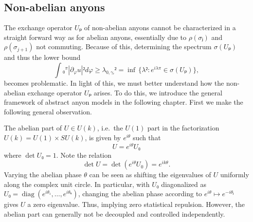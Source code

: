 \subsection{Non-abelian anyons}

The exchange operator $Uₚ$ of non-abelian anyons cannot be characterized in a straight forward way as for abelian anyons, essentially due to $ρ(σⱼ)$ and $ρ(σ_{j+1})$ not commuting. Because of this, determining the spectrum $σ(Uₚ)$ and thus the lower bound
\begin{equation}
    ∫₀^π |∂_φu|² dφ ≥ λ_{0,γᵣ}² = \inf \, \{ λ² : e^{iλπ} ∈ σ(Uₚ) \},
\end{equation}
becomes problematic. In light of this, we must better understand how the non-abelian exchange operator $Uₚ$ arises. To do this, we introduce the general framework of abstract anyon models in the following chapter. First we make the following general observation.

\begin{remark}
  The abelian part of $U ∈ U(k)$, i.e.\ the $U(1)$ part in the factorization $U(k) = U(1) × SU(k)$, is given by $e^{iθ}$ such that
  \begin{equation}
    U = e^{iθ} U₀
  \end{equation}
  where $\det U₀ = 1$. Note the relation
  \begin{equation}
    \det U = \det(e^{iθ}U_0) = e^{ikθ}.
  \end{equation}
  Varying the abelian phase $θ$ can be seen as shifting the eigenvalues of $U$ uniformly along the complex unit circle. In particular, with $U₀$ diagonalized as $U₀ = \operatorname{diag}(e^{iθ₁}, …, e^{iθₖ})$, changing the abelian phase according to $e^{iθ} ↦ e^{-iθⱼ}$ gives $U$ a zero eigenvalue. Thus, implying zero statistical repulsion. However, the abelian part can generally not be decoupled and controlled independently.
\end{remark}
